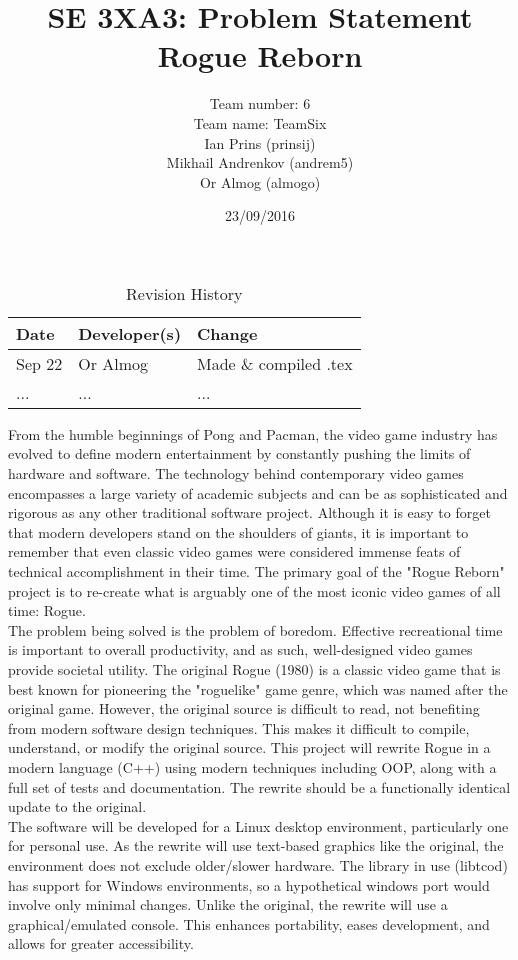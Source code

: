 \documentclass{article}
\title{SE 3XA3: Problem Statement\\Rogue Reborn}
\author{Team number: 6
		\\ Team name: TeamSix
		\\ Ian Prins (prinsij)
		\\ Mikhail Andrenkov (andrem5)
		\\ Or Almog (almogo)
}
\date{23/09/2016}
\begin{document}
\begin{table}[hp]
\caption{Revision History} \label{TblRevisionHistory}
\begin{tabularx}{\textwidth}{llX}
\toprule
\textbf{Date} & \textbf{Developer(s)} & \textbf{Change}\\
\midrule
Sep 22 & Or Almog & Made \& compiled .tex\\
... & ... & ...\\
\bottomrule
\end{tabularx}
\end{table}

\newpage

\maketitle


From the humble beginnings of Pong and Pacman, the video game industry has evolved to define modern entertainment by constantly pushing the limits of hardware and software. The technology behind contemporary video games encompasses a large variety of academic subjects and can be as sophisticated and rigorous as any other traditional software project. Although it is easy to forget that modern developers stand on the shoulders of giants, it is important to remember that even classic video games were considered immense feats of technical accomplishment in their time. The primary goal of the "Rogue Reborn" project is to re-create what is arguably one of the most iconic video games of all time: Rogue.\\


The problem being solved is the problem of boredom. Effective recreational time is important to overall productivity, and as such, well-designed video games provide societal utility. The original Rogue (1980) is a classic video game that is best known for pioneering the "roguelike" game genre, which was named after the original game. However, the original source is difficult to read, not benefiting from modern software design techniques. This makes it difficult to compile, understand, or modify the original source. This project will rewrite Rogue in a modern language (C++) using modern techniques including OOP, along with a full set of tests and documentation. The rewrite should be a functionally identical update to the original.\\


The software will be developed for a Linux desktop environment, particularly one for personal use. As the rewrite will use text-based graphics like the original, the environment does not exclude older/slower hardware. The library in use (libtcod) has support for Windows environments, so a hypothetical windows port would involve only minimal changes. Unlike the original, the rewrite will use a graphical/emulated console. This enhances portability, eases development, and allows for greater accessibility.\\
\end{document}
